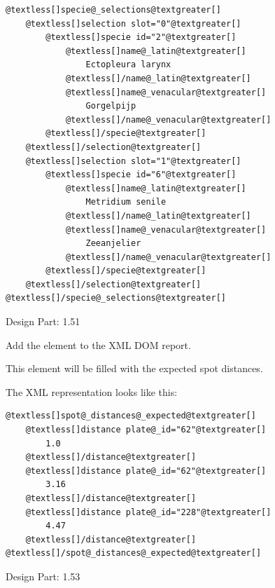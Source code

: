\documentclass[letterpaper,10pt,english]{sphinxmanual}
\begin{document}
\begin{fulllineitems}
\begin{fulllineitems}
\begin{Verbatim}[commandchars=@\[\]]
@textless[]specie@_selections@textgreater[]
    @textless[]selection slot="0"@textgreater[]
        @textless[]specie id="2"@textgreater[]
            @textless[]name@_latin@textgreater[]
                Ectopleura larynx
            @textless[]/name@_latin@textgreater[]
            @textless[]name@_venacular@textgreater[]
                Gorgelpijp
            @textless[]/name@_venacular@textgreater[]
        @textless[]/specie@textgreater[]
    @textless[]/selection@textgreater[]
    @textless[]selection slot="1"@textgreater[]
        @textless[]specie id="6"@textgreater[]
            @textless[]name@_latin@textgreater[]
                Metridium senile
            @textless[]/name@_latin@textgreater[]
            @textless[]name@_venacular@textgreater[]
                Zeeanjelier
            @textless[]/name@_venacular@textgreater[]
        @textless[]/specie@textgreater[]
    @textless[]/selection@textgreater[]
@textless[]/specie@_selections@textgreater[]
\end{Verbatim}

Design Part: 1.51

\end{fulllineitems}


\begin{fulllineitems}
\label{setlyze/std:setlyze.std.ReportGenerator.set_spot_distances_expected}
Add the element  to the XML DOM
report.

This element will be filled with the expected spot distances.

The XML representation looks like this:

\begin{Verbatim}[commandchars=@\[\]]
@textless[]spot@_distances@_expected@textgreater[]
    @textless[]distance plate@_id="62"@textgreater[]
        1.0
    @textless[]/distance@textgreater[]
    @textless[]distance plate@_id="62"@textgreater[]
        3.16
    @textless[]/distance@textgreater[]
    @textless[]distance plate@_id="228"@textgreater[]
        4.47
    @textless[]/distance@textgreater[]
@textless[]/spot@_distances@_expected@textgreater[]
\end{Verbatim}

Design Part: 1.53

\end{fulllineitems}


\end{fulllineitems}
\end{document}
